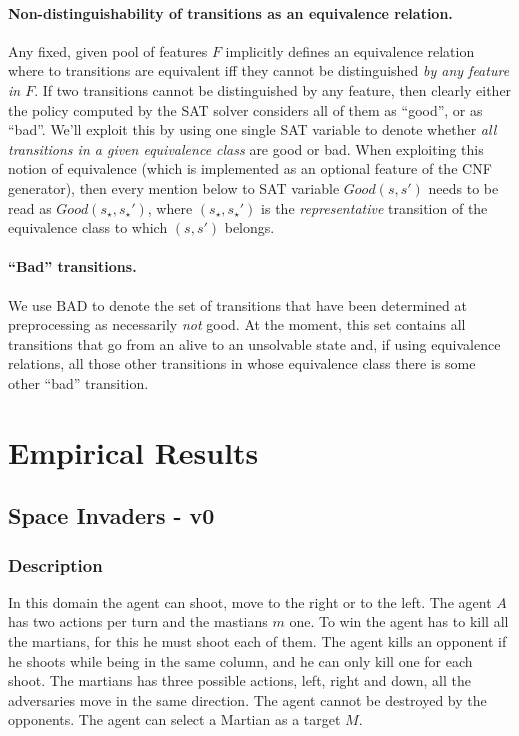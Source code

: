 \documentclass[a4paper]{article}
\newcommand{\badtx}{\ensuremath{\mathrm{BAD}}}
\begin{document}
\paragraph{Non-distinguishability of transitions as an equivalence relation.}
Any fixed, given pool of features $F$ implicitly defines an equivalence relation where to transitions are
equivalent iff they cannot be distinguished \emph{by any feature in $F$}.
If two transitions cannot be distinguished by any feature, then clearly either the policy computed by the SAT solver
considers all of them as ``good'', or as ``bad''.
We'll exploit this by using one single SAT variable to denote whether \emph{all transitions in a given equivalence
class} are good or bad. When exploiting this notion of equivalence (which is implemented as an optional feature of
the CNF generator), then every mention below to SAT variable $Good(s, s')$ needs to be read as $Good(s_{\star}, s_{\star}')$,
where $(s_{\star}, s_{\star}')$ is the \emph{representative} transition of the equivalence class to which $(s, s')$ belongs.

\paragraph{``Bad'' transitions.}
We use \badtx{} to denote the set of transitions that have been determined at preprocessing as necessarily
\emph{not} good.
At the moment, this set contains all transitions that go from an alive to an unsolvable state and, if using
equivalence relations, all those other transitions in whose equivalence class there is some other ``bad'' transition.


\newpage

\section{Empirical Results}


\subsection{Space Invaders - v0}
\subsubsection{Description}
In this domain the agent can shoot, move to the right or to the left. The agent $A$ has two actions per turn and the mastians $m$ one. To win the agent has to kill all the martians, for this he must shoot each of them. The agent kills an opponent if he shoots while being in the same column, and he can only kill one for each shoot. The martians has three possible actions, left, right and down, all the adversaries move in the same direction. The agent cannot be destroyed by the opponents. The agent can select a Martian as a target $M$.
\end{document}
